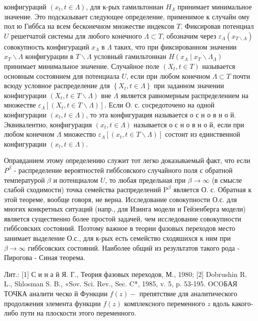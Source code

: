 \documentclass[10pt]{article}
\begin{document}
конфигураций $\left(x_{t}, t \in \Lambda\right)$, для к-рых гамильтониан $H_{\Lambda}$ принимает минимальное значение. Это подсказывает следующее определение, применимое к случайн ому пол ю Гиббса на всем бесконечном множестве индексов $T$. Фиксировав потенциал $U$ решетчатой системы для любого конечного $\Lambda \subset T$, обозначим через $\varepsilon_{\Lambda}\left(x_{T \backslash \Lambda}\right)$ совокупность конфигураций $x_{\Lambda}$ в $\Lambda$ таких, что при фиксированном значении $x_{T} \backslash \Lambda$ конфигурации в $T \backslash \Lambda$ условный гамильтониан $H\left(x_{\Lambda} \mid x_{T} \backslash \Lambda_{\Lambda}\right)$ принимает минимальное значение. Случайное поле $\left(X_{t}, t \in T\right)$ называется основным состоянием для потенциала $U$, если при любом конечном $\Lambda \subset T$ почти всюду условное распределение для $\left\{X_{t}, t \in \Lambda\right\}$ при заданном значении конфигурации $\left(X_{t}, t \in T \backslash \Lambda\right)$ вне $\Lambda$ является равномерным распределением на множестве $\varepsilon_{\Lambda}\left[\left(X_{t}, t \in T \backslash \Lambda\right)\right]$. Если О. с. сосредоточено на одной конфигурации $\left(x_{t}, t \in \Lambda\right)$, то эта конфигурация называется о с н о в н о й. Эквивалентно, конфигурация $\left(x_{t}, t \in \Lambda\right)$ называется о с н о в н о й, если при любом конечном $\Lambda$ множество $\varepsilon_{\Lambda}\left[\left(x_{t}, t \in T \backslash \Lambda\right)\right]$ состоит из единственной конфигурации $\left(x_{t}, t \in \Lambda\right)$.



Оправданием этому определению служит тот легко доказываемый факт, что если $P^{\beta}$ - распределение вероятностей гиббсовского случайного поля с обратной температурой $\beta$ и потенциалом $U$, то любая предельная при $\beta \rightarrow \infty$ (в смысле слабой сходимости) точка семейства распределений $\mathrm{P}^{\beta}$ является О. с. Обратная к этой теореме, вообще говоря, не верна. Исследование совокупности О.с. для многих конкретных ситуаций (напр., для Изинга модели и Гейзенберга модели) является существенно более простой задачей, чем исследование совокупности гиббсовских состояний. Поэтому важное в теории фазовых переходов место занимает выделение О.с., для к-рых есть семейство сходяшихся к ним при $\beta \rightarrow \infty$ гиббсовских состояний. Наиболее общий из результатов такого рода - Пирогова - Синая теорема.



Лит.: [1] С и н а й Я. Г., Теория фазовых переходов, М., 1980; [2] Dobrushin R. L., Shlosman S. B., «Sov. Sci. Rev., Sec. C*, 1985, v. 5, p. 53-195. OCOБАЯ ТОЧКА аналити ческо й Функции $f(z)-$ препятствие для аналитического продолжения элемента функции $f(z)$ комплексного переменного $z$ вдоль какого-либо пути на плоскости этого переменного.
\end{document}
